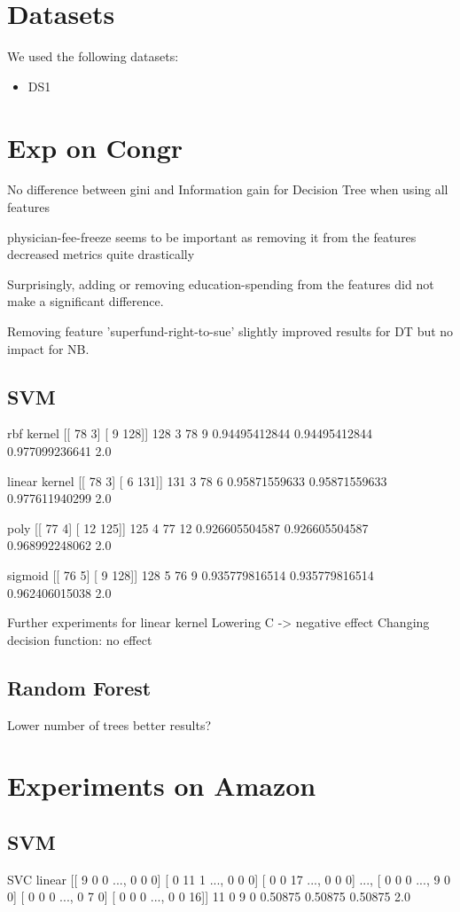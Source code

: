 \section{Datasets}
We used the following datasets:
\begin{itemize}
\item DS1
\end{itemize}

\section{Exp on Congr}
No difference between gini and Information gain for Decision Tree when using all features

physician-fee-freeze seems to be important as removing it from the features decreased metrics quite drastically

Surprisingly, adding or removing education-spending from the features did not make a significant difference.

Removing feature 'superfund-right-to-sue' slightly improved results for DT but no impact for NB.

\subsection{SVM}

rbf kernel
[[ 78   3]
 [  9 128]]
128 3 78 9
0.94495412844 0.94495412844 0.977099236641 2.0

linear kernel
[[ 78   3]
 [  6 131]]
131 3 78 6
0.95871559633 0.95871559633 0.977611940299 2.0

poly
[[ 77   4]
 [ 12 125]]
125 4 77 12
0.926605504587 0.926605504587 0.968992248062 2.0

sigmoid
[[ 76   5]
 [  9 128]]
128 5 76 9
0.935779816514 0.935779816514 0.962406015038 2.0

Further experiments for linear kernel
Lowering C -> negative effect
Changing decision function: no effect

\subsection{Random Forest}
Lower number of trees better results?

\section{Experiments on Amazon}
\subsection{SVM}
SVC linear
[[ 9  0  0 ...,  0  0  0]
 [ 0 11  1 ...,  0  0  0]
 [ 0  0 17 ...,  0  0  0]
 ..., 
 [ 0  0  0 ...,  9  0  0]
 [ 0  0  0 ...,  0  7  0]
 [ 0  0  0 ...,  0  0 16]]
11 0 9 0
0.50875 0.50875 0.50875 2.0

